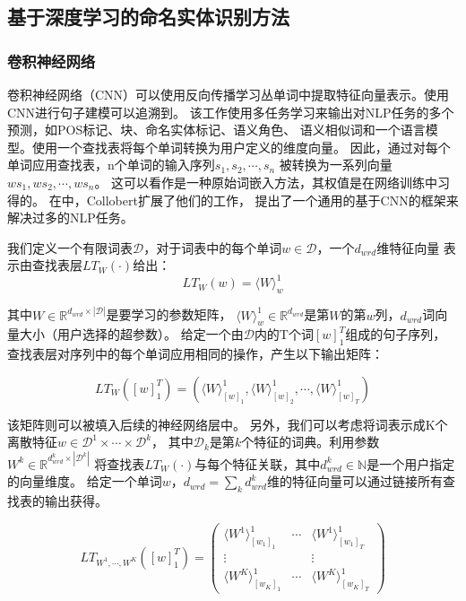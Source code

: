 \subsection{基于深度学习的命名实体识别方法}

\subsubsection{卷积神经网络}

卷积神经网络（CNN）可以使用反向传播学习丛单词中提取特征向量表示。使用CNN进行句子建模可以追溯到\parencite{collobert2008unified}。
该工作使用多任务学习来输出对NLP任务的多个预测，如POS标记、块、命名实体标记、语义角色、
语义相似词和一个语言模型。使用一个查找表将每个单词转换为用户定义的维度向量。
因此，通过对每个单词应用查找表，n个单词的输入序列$s_1,s_2,\cdots, s_n$
被转换为一系列向量$ws_1,ws_2, \cdots, ws_n$。
这可以看作是一种原始词嵌入方法，其权值是在网络训练中习得的。
在\parencite{collobert2011natural}中，Collobert扩展了他们的工作，
提出了一个通用的基于CNN的框架来解决过多的NLP任务。

我们定义一个有限词表$\mathcal{D}$，对于词表中的每个单词$w\in \mathcal{D}$，一个$d_{wrd}$维特征向量
表示由查找表层$LT_W(·)$给出：
\begin{equation}
	LT_W(w) = \langle W\rangle _w^1
\end{equation}

其中$W \in \mathbb{R} ^{d_{wrd} \times |\mathcal{D}|}$是要学习的参数矩阵，
$\langle W\rangle _w^1 \in \mathbb{R} ^{d_{wrd}}$是第$W$的第$w$列，$d_{wrd}$词向量大小（用户选择的超参数）。
给定一个由$\mathcal{D}$内的T个词$[w]_1^T$组成的句子序列，
查找表层对序列中的每个单词应用相同的操作，产生以下输出矩阵：

\begin{equation}\label{eq1}
	LT_W([w]_1^T) = \left(\langle W\rangle _{[w]_1}^1, \langle W\rangle _{[w]_2}^1, \cdots, \langle W\rangle _{[w]_T}^1 \right)
\end{equation}

该矩阵则可以被填入后续的神经网络层中。
另外，我们可以考虑将词表示成K个离散特征$w \in \mathcal{D}^1 \times \cdots \times \mathcal{D}^k$，
其中$\mathcal{D}_k$是第$k$个特征的词典。利用参数$W^k \in \mathbb{R} ^{d^k_{wrd} \times |\mathcal{D}^k|}$
将查找表$LT_W(·)$与每个特征关联，其中$d^k_{wrd}\in \mathbb{N}$是一个用户指定的向量维度。
给定一个单词$w$，$d_{wrd}=\sum_k d^k_{wrd}$维的特征向量可以通过链接所有查找表的输出获得。

\begin{equation}
	LT_{W^1, \cdots, W^K}([w]^T_1)
	= \left(
		\begin{matrix}
			\langle W^1 \rangle _{[w_1]_1}^1 & \cdots & \langle W^1 \rangle _{[w_1]_T}^1 \\
			\vdots &  & \vdots \\
			\langle W^K \rangle _{[w_K]_1}^1 & \cdots & \langle W^K \rangle _{[w_K]_T}^1 
		\end{matrix}
	\right)
\end{equation}


